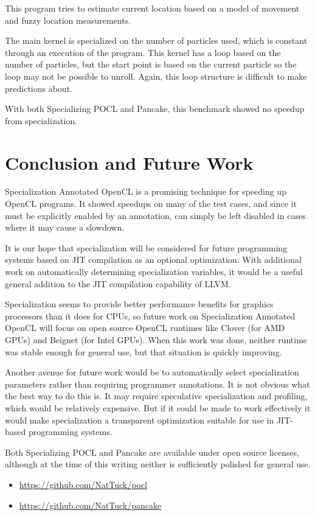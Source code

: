 \documentclass{acm_proc_article-sp}
\begin{document}
This program tries to estimate current location based on a model of movement
and fuzzy location measurements. 

The main kernel is specialized on the number of particles used, which is
constant through an execution of the program. This kernel has a loop based on
the number of particles, but the start point is based on the current particle
so the loop may not be possible to unroll. Again, this loop structure is
difficult to make predictions about.

With both Specializing POCL and Pancake, this benchmark showed no speedup from
specialization.

\section{Conclusion and Future Work}

Specialization Annotated OpenCL is a promising technique for speeding up OpenCL
programs. It showed speedups on many of the test cases, and since it must be
explicitly enabled by an annotation, can simply be left disabled in cases where
it may cause a slowdown.

It is our hope that specialization will be considered for future programming
systems based on JIT compilation as an optional optimization. With additional
work on automatically determining specialization variables, it would be a
useful general addition to the JIT compilation capability of LLVM.

\balancecolumns

Specialization seems to provide better performance benefits for graphics
processors than it does for CPUs, so future work on Specialization Annotated
OpenCL will focus on open source OpenCL runtimes like Clover (for AMD GPUs) and
Beignet (for Intel GPUs). When this work was done, neither runtime was stable
enough for general use, but that situation is quickly improving.

Another avenue for future work would be to automatically select specialization
parameters rather than requiring programmer annotations. It is not obvious what
the best way to do this is. It may require speculative specialization and
profiling, which would be relatively expensive. But if it could be made to work
effectively it would make specialization a transparent optimization suitable for
use in JIT-based programming systems.

Both Specializing POCL and Pancake are available under open source licenses,
although at the time of this writing neither is sufficiently polished for
general use.

\begin{itemize}
    \item \url{https://github.com/NatTuck/pocl}
    \item \url{https://github.com/NatTuck/pancake}
\end{itemize}



\end{document}
